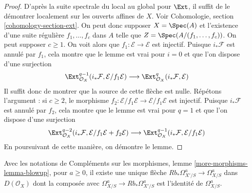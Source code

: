 \begin{proof}
D'après la suite spectrale du local au global pour $\Ext$, il suffit
de le démontrer localement sur les ouverts affines de $X$. Voir
Cohomologie, section \ref{cohomology-section-ext}.
On peut donc supposer $X = \Spec(A)$
et l'existence d'une suite régulière $f_1, \ldots, f_c$ dans $A$
telle que $Z = \Spec(A/(f_1, \ldots, f_c))$. On peut supposer $c \geq 1$.
On voit alors que $f_1 : \mathcal{E} \to \mathcal{E}$
est injectif. Puisque $i_*\mathcal{F}$ est annulé par $f_1$,
cela montre que le lemme est vrai pour $i = 0$ et que l'on dispose
d'une surjection
$$
\Ext^{q - 1}_{\mathcal{O}_X}(i_*\mathcal{F}, \mathcal{E}/f_1\mathcal{E})
\longrightarrow
\Ext^q_{\mathcal{O}_X}(i_*\mathcal{F}, \mathcal{E})
$$
Il suffit donc de montrer que la source de cette flèche est nulle.
Répétons l'argument : si $c \geq 2$, le morphisme
$f_2 : \mathcal{E}/f_1\mathcal{E} \to \mathcal{E}/f_1\mathcal{E}$
est injectif. Puisque $i_*\mathcal{F}$ est annulé par $f_2$,
cela montre que le lemme est vrai pour $q = 1$ et que l'on dispose d'une
surjection
$$
\Ext^{q - 2}_{\mathcal{O}_X}(i_*\mathcal{F},
\mathcal{E}/f_1\mathcal{E} + f_2\mathcal{E})
\longrightarrow
\Ext^{q - 1}_{\mathcal{O}_X}(i_*\mathcal{F}, \mathcal{E}/f_1\mathcal{E})
$$
En poursuivant de cette manière, on démontre le lemme.
\end{proof}

\begin{lemma}
\label{lemma-splitting-on-omega-a}
Avec les notations de Compléments sur les morphismes, lemme \ref{more-morphisms-lemma-blowup},
pour $a \geq 0$, il existe une unique flèche
$Rb_*\Omega^a_{X'/S} \to \Omega^a_{X/S}$ dans $D(\mathcal{O}_X)$
dont la composée avec $\Omega^a_{X/S} \to Rb_*\Omega^a_{X'/S}$
est l'identité de $\Omega^a_{X/S}$.
\end{lemma}

